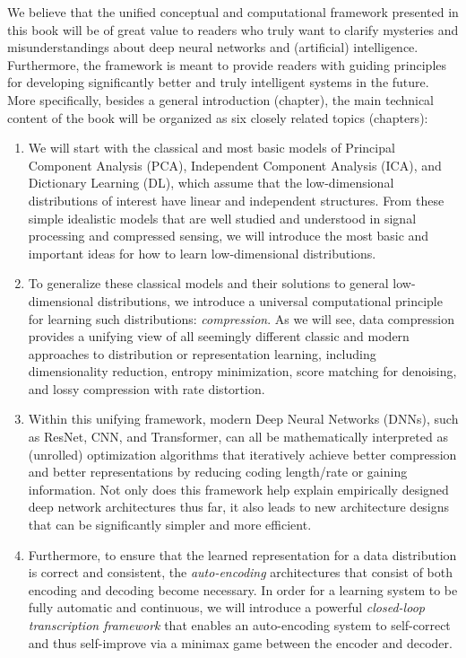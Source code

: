 \documentclass[../../book-main.tex]{subfiles}
\begin{document}
We believe that the unified conceptual and computational framework presented in this book will be of great value to readers who truly want to clarify mysteries and misunderstandings about deep neural networks and (artificial) intelligence. Furthermore, the framework is meant to provide readers with guiding principles for developing significantly better and truly intelligent systems in the future. More specifically, besides a general introduction (chapter), the main technical content of the book will be organized as six closely related topics (chapters):
\begin{enumerate}
\item We will start with the classical and most basic models of Principal Component Analysis (PCA), Independent Component Analysis (ICA), and Dictionary Learning (DL), which assume that the low-dimensional distributions of interest have linear and independent structures. From these simple idealistic models that are well studied and understood in signal processing and compressed sensing, we will introduce the most basic and important ideas for how to learn low-dimensional distributions.

\item To generalize these classical models and their solutions to general low-dimensional distributions, we introduce a universal computational principle for learning such distributions: {\em compression}. As we will see, data compression provides a unifying view of all seemingly different classic and modern approaches to distribution or representation learning, including dimensionality reduction, entropy minimization, score matching for denoising, and lossy compression with rate distortion. 

\item Within this unifying framework, modern Deep Neural Networks (DNNs), such as ResNet, CNN, and Transformer, can all be mathematically interpreted as (unrolled) optimization algorithms that iteratively achieve better compression and better representations by reducing coding length/rate or gaining information. Not only does this framework help explain empirically designed deep network architectures thus far, it also leads to new architecture designs that can be significantly simpler and more efficient.

\item Furthermore, to ensure that the learned representation for a data distribution is correct and consistent, the {\em auto-encoding} architectures that consist of both encoding and decoding become necessary. In order for a learning system to be fully automatic and continuous, we will introduce a powerful {\em closed-loop transcription framework} that enables an auto-encoding system to self-correct and thus self-improve via a minimax game between the encoder and decoder.  


\end{enumerate}
\end{document}
